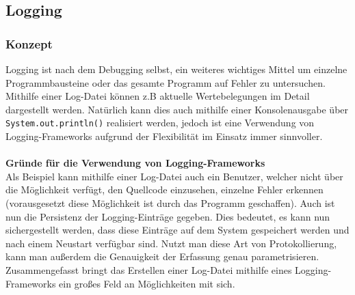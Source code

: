 \subsection{Logging}
\subsubsection{Konzept}\label{sssec:logOverview}
Logging ist nach dem Debugging selbst, ein weiteres wichtiges Mittel um einzelne Programmbausteine oder das gesamte Programm auf Fehler zu untersuchen.
Mithilfe einer Log-Datei können z.B aktuelle Wertebelegungen im Detail dargestellt werden.
Natürlich kann dies auch mithilfe einer Konsolenausgabe über \lstinline[style=java]{System.out.println()} realisiert werden, jedoch ist eine Verwendung von Logging-Frameworks aufgrund der Flexibilität im Einsatz immer sinnvoller.\\\\
\textbf{Gründe für die Verwendung von Logging-Frameworks}\\
Als Beispiel kann mithilfe einer Log-Datei auch ein Benutzer, welcher nicht über die Möglichkeit verfügt, den Quellcode einzusehen, einzelne Fehler erkennen (vorausgesetzt diese Möglichkeit ist durch das Programm geschaffen).
Auch ist nun die Persistenz der Logging-Einträge gegeben.
Dies bedeutet, es kann nun sichergestellt werden, dass diese Einträge auf dem System gespeichert werden und nach einem Neustart verfügbar sind.
Nutzt man diese Art von Protokollierung, kann man außerdem die Genauigkeit der Erfassung genau parametrisieren.\\
Zusammengefasst bringt das Erstellen einer Log-Datei mithilfe eines Logging-Frameworks ein großes Feld an Möglichkeiten mit sich.\\\\

